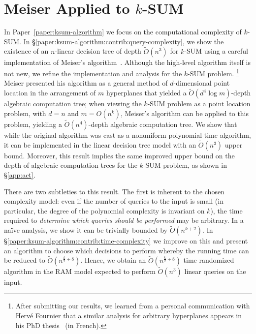 \section{\done Meiser Applied to \(k\)-SUM}

In Paper~\ref{paper:ksum-algorithm}
we focus on the computational complexity of \(k\)-SUM\@.
%
In \S\ref{paper:ksum-algorithm:contrib:query-complexity}, we show the existence of an $n$-linear
decision tree of depth $\tilde{O}(n^3)$ for \(k\)-SUM using a careful
implementation of Meiser's algorithm~\cite{M93}.
%
Although the high-level algorithm itself is not new, we refine the
implementation and analysis for the \(k\)-SUM problem.%
\footnote{After submitting our results, we learned from a personal communication
with Herv\'e Fournier that a similar analysis for arbitrary hyperplanes appears in his PhD
thesis~\cite{F01} (in French).}
%
Meiser presented his algorithm as a general method of
$d$-dimensional
point location in the
arrangement of $m$ hyperplanes that yielded a
$\tilde{O}(d^4 \log m)$-depth algebraic computation tree;
%
when viewing the \(k\)-SUM problem as a point
location problem, with \(d=n\) and \(m = O(n^k)\),
Meiser's algorithm can be applied
to this problem, yielding a $\tilde{O}(n^4)$-depth algebraic computation tree.
%
We show that while the original algorithm was cast as a nonuniform
polynomial-time algorithm, it can be implemented in the linear decision tree
model with an
$\tilde{O}(n^3)$ upper bound.
%
Moreover, this result implies the same improved upper bound on the depth of
algebraic computation trees for the $k$-SUM problem,
as shown in \S\ref{app:act}.

There are two subtleties to this result. The first is inherent to the chosen
complexity model: even if the number of queries to the input is small (in
particular, the degree of the polynomial complexity is invariant on $k$), the
time required to \emph{determine which queries should be performed} may be
arbitrary. In a na\"ive analysis, we show it can be trivially bounded by
$\tilde{O}(n^{k+2})$.
%
%
In \S\ref{paper:ksum-algorithm:contrib:time-complexity} we improve on this and present an
algorithm to choose which decisions to perform whereby the running time can be
reduced to $\tilde{O}(n^{\frac{k}{2}+8})$. Hence, we obtain an
$\tilde{O}(n^{\frac{k}{2}+8})$ time randomized algorithm in the RAM model
expected to perform $\tilde{O}(n^3)$ linear queries on the input.
%



